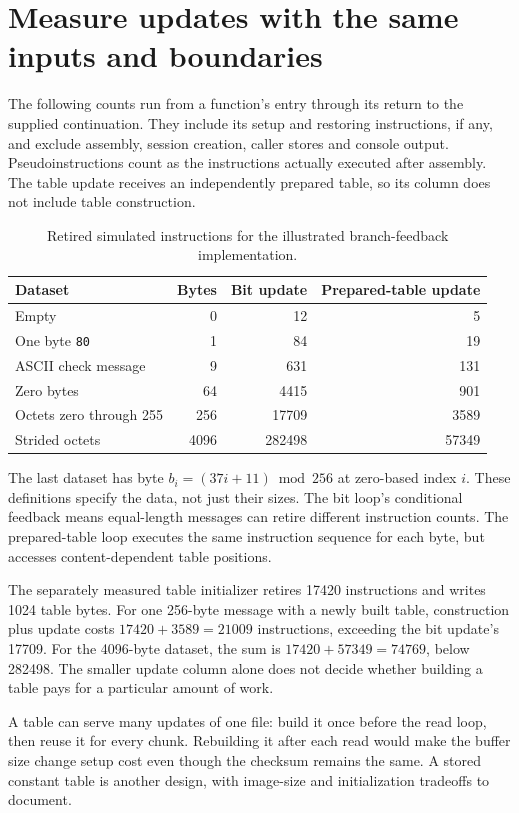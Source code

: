 \section{Measure updates with the same inputs and boundaries}
The following counts run from a function's entry through its return to the supplied
continuation. They include its setup and restoring instructions, if any, and exclude
assembly, session creation, caller stores and console output. Pseudoinstructions count
as the instructions actually executed after assembly. The table update receives an
independently prepared table, so its column does not include table construction.

\begin{table}[htbp]
  \centering
  \caption{Retired simulated instructions for the illustrated branch-feedback implementation.}
  \begin{tabular}{lrrr}
    \toprule
    Dataset                 & Bytes & Bit update & Prepared-table update \\
    \midrule
    Empty                   & 0     & 12         & 5                     \\
    One byte \texttt{80}    & 1     & 84         & 19                    \\
    ASCII check message     & 9     & 631        & 131                   \\
    Zero bytes              & 64    & 4415       & 901                   \\
    Octets zero through 255 & 256   & 17709      & 3589                  \\
    Strided octets          & 4096  & 282498     & 57349                 \\
    \bottomrule
  \end{tabular}
\end{table}

The last dataset has byte \(b_i=(37i+11)\bmod256\) at zero-based index \(i\).
These definitions specify the data, not just their sizes. The bit loop's conditional
feedback means equal-length messages can retire different instruction counts. The
prepared-table loop executes the same instruction sequence for each byte, but accesses
content-dependent table positions.

The separately measured table initializer retires 17420 instructions and writes
1024 table bytes. For one 256-byte message with a newly built table, construction plus
update costs \(17420+3589=21009\) instructions, exceeding the bit update's 17709.
For the 4096-byte dataset, the sum is \(17420+57349=74769\), below 282498.
The smaller update column alone does not decide whether building a table pays for a
particular amount of work.

A table can serve many updates of one file: build it once before the read loop,
then reuse it for every chunk. Rebuilding it after each read would make the buffer
size change setup cost even though the checksum remains the same. A stored constant
table is another design, with image-size and initialization tradeoffs to document.
